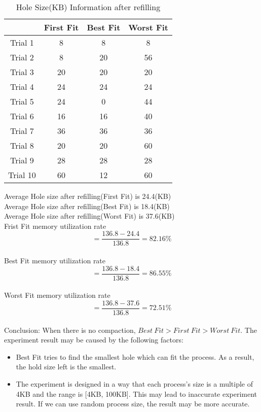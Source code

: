 \documentclass[12pt]{article}
\begin{document}
\begin{table}[h!]
\centering
\begin{tabular}{|c|c|c|c|}
\hline
         & First Fit & Best Fit & Worst Fit \\ \hline
Trial 1  & 8        & 8        & 8        \\ \hline
Trial 2  & 8        & 20       & 56       \\ \hline
Trial 3  & 20       & 20       & 20       \\ \hline
Trial 4  & 24       & 24       & 24       \\ \hline
Trial 5  & 24       & 0        & 44       \\ \hline
Trial 6  & 16       & 16       & 40        \\ \hline
Trial 7  & 36       & 36       & 36       \\ \hline
Trial 8  & 20       & 20       & 60       \\ \hline
Trial 9  & 28       & 28       & 28       \\ \hline
Trial 10 & 60       & 12       & 60        \\ \hline
\end{tabular}
\caption{Hole Size(KB) Information after refilling }
\end{table}
\noindent Average Hole size after refilling(First Fit) is 24.4(KB)\\
Average Hole size after refilling(Best Fit) is 18.4(KB)\\
Average Hole size after refilling(Worst Fit) is 37.6(KB)\\

\noindent Frist Fit memory utilization rate $$= \frac{136.8 - 24.4}{136.8} = 82.16\%$$\\
Best Fit memory utilization rate $$= \frac{136.8 - 18.4}{136.8} = 86.55\%$$\\
Worst Fit memory utilization rate $$= \frac{136.8 - 37.6}{136.8} = 72.51\%$$\\

\noindent Conclusion: When there is no compaction, $Best\ Fit > First\ Fit > Worst\ Fit$. The experiment result may be caused by the following factors:
\begin{itemize}
\item Best Fit tries to find the smallest hole which can fit the process. As
a result, the hold size left is the smallest.
\item The experiment is designed in a way that each process's size is a 
multiple of 4KB and the range is [4KB, 100KB]. This may lead to inaccurate 
experiment result. If we can use random process size, the result may be more
accurate.
\end{itemize}
\newpage
\end{document}
